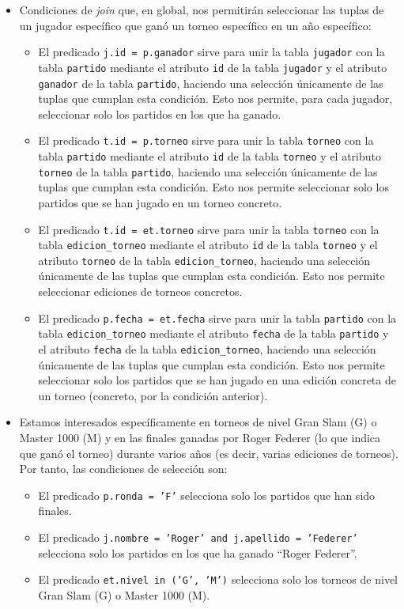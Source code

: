 \begin{itemize}
\item Condiciones de \textit{join} que, en global, nos permitirán seleccionar las tuplas de un jugador específico que ganó un torneo específico en un año específico:
\begin{itemize}
\item El predicado \texttt{j.id = p.ganador} sirve para unir la tabla \texttt{jugador} con la tabla \texttt{partido} mediante el atributo \texttt{id} de la tabla \texttt{jugador} y el atributo \texttt{ganador} de la tabla \texttt{partido}, haciendo una selección únicamente de las tuplas que cumplan esta condición. Esto nos permite, para cada jugador, seleccionar solo los partidos en los que ha ganado.
\item El predicado \texttt{t.id = p.torneo} sirve para unir la tabla \texttt{torneo} con la tabla \texttt{partido} mediante el atributo \texttt{id} de la tabla \texttt{torneo} y el atributo \texttt{torneo} de la tabla \texttt{partido}, haciendo una selección únicamente de las tuplas que cumplan esta condición. Esto nos permite seleccionar solo los partidos que se han jugado en un torneo concreto.
\item El predicado \texttt{t.id = et.torneo} sirve para unir la tabla \texttt{torneo} con la tabla \texttt{edicion\_torneo} mediante el atributo \texttt{id} de la tabla \texttt{torneo} y el atributo \texttt{torneo} de la tabla \texttt{edicion\_torneo}, haciendo una selección únicamente de las tuplas que cumplan esta condición. Esto nos permite seleccionar ediciones de torneos concretos.
\item El predicado \texttt{p.fecha = et.fecha} sirve para unir la tabla \texttt{partido} con la tabla \texttt{edicion\_torneo} mediante el atributo \texttt{fecha} de la tabla \texttt{partido} y el atributo \texttt{fecha} de la tabla \texttt{edicion\_torneo}, haciendo una selección únicamente de las tuplas que cumplan esta condición. Esto nos permite seleccionar solo los partidos que se han jugado en una edición concreta de un torneo (concreto, por la condición anterior).
\end{itemize}
\item Estamos interesados específicamente en torneos de nivel Gran Slam (G) o Master 1000 (M) y en las finales ganadas por Roger Federer (lo que indica que ganó el torneo) durante varios años (es decir, varias ediciones de torneos). Por tanto, las condiciones de selección son:
\begin{itemize}
\item El predicado \texttt{p.ronda = 'F'} selecciona solo los partidos que han sido finales.
\item El predicado \texttt{j.nombre = 'Roger' and j.apellido = 'Federer'} selecciona solo los partidos en los que ha ganado ``Roger Federer''.
\item El predicado \texttt{et.nivel in ('G', 'M')} selecciona solo los torneos de nivel Gran Slam (G) o Master 1000 (M).
\end{itemize}
\end{itemize}

